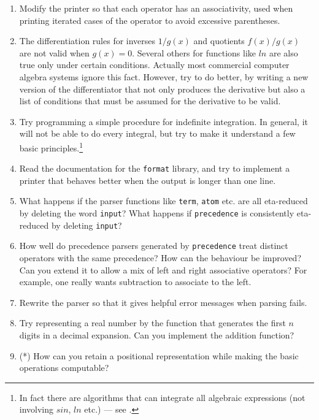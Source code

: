 \begin{enumerate}

\item Modify the printer so that each operator has an associativity, used when
printing iterated cases of the operator to avoid excessive parentheses.

\item The differentiation rules for inverses $1 / g(x)$ and quotients $f(x) /
g(x)$ are not valid when $g(x) = 0$. Several others for functions like $ln$ are
also true only under certain conditions. Actually most commercial computer
algebra systems ignore this fact. However, try to do better, by writing a new
version of the differentiator that not only produces the derivative but also a
list of conditions that must be assumed for the derivative to be valid.

\item Try programming a simple procedure for indefinite integration. In
general, it will not be able to do every integral, but try to make it
understand a few basic principles.\footnote{In fact there are algorithms that
can integrate all algebraic expressions (not involving $sin$, $ln$ etc.) ---
see .}

\item Read the documentation for the {\tt format} library, and try to implement
a printer that behaves better when the output is longer than one line.

\item What happens if the parser functions like {\tt term}, {\tt atom} etc. are
all eta-reduced by deleting the word {\tt input}? What happens if
{\tt precedence} is consistently eta-reduced by deleting {\tt input}?

\item How well do precedence parsers generated by {\tt precedence} treat
distinct operators with the same precedence? How can the behaviour be improved?
Can you extend it to allow a mix of left and right associative operators? For
example, one really wants subtraction to associate to the left.

\item Rewrite the parser so that it gives helpful error messages when parsing
fails.

\item Try representing a real number by the function that generates the first
$n$ digits in a decimal expansion. Can you implement the addition function?

\item (*) How can you retain a positional representation while making the basic
operations computable?


\end{enumerate}
